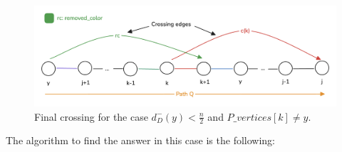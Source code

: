 \begin{figure}[H]
    \centering
    \includegraphics[width=1\textwidth]{figuras/cycle_n-1_last_crossing.png}
    \caption{Final crossing for the case $d^-_D(y) < \frac{n}{2}$ and $P\_vertices[k] \neq y$.}
    \label{fig:cycle_n-1_last_crossing}
\end{figure}

The algorithm to find the answer in this case is the following:











